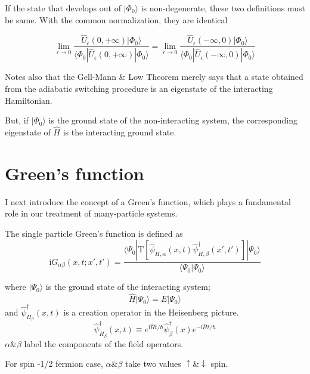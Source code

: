 
If the state that develops out of $|\Phi_0\rangle$ is non-degenerate, these two definitions must be same. With the common normalization, they are identical

\[\lim_{\epsilon\to0}\frac{\hat{U}_\epsilon(0,+\infty)|\Phi_0\rangle}{\langle\Phi_0|\hat{U}_\epsilon(0,+\infty)|\Phi_0\rangle}=\lim_{\epsilon\to0}\frac{\hat{U}_\epsilon(-\infty,0)|\Phi_0\rangle}{\langle\Phi_0|\hat{U}_\epsilon(-\infty,0)|\Phi_0\rangle} \]

Notes also that the Gell-Mann \& Low Theorem merely says that a state obtained from the adiabatic switching procedure is an eigenstate of the interacting Hamiltonian. 

But, if $|\Phi_0\rangle$ is the ground state of the non-interacting system, the corresponding eigenstate of $\hat{H}$ is {} the interacting ground state. 




\section{Green's function}

I next introduce the concept of a Green's function, which plays a fundamental role in our treatment of many-particle systems.

The single particle Green's function is defined as
\begin{equation}\label{2.3.1}
\mathrm{i}G_{\alpha\beta}(x,t;x',t')=\frac{\langle\Psi_0|\mathrm{T}[\hat \psi_{H,\alpha}(x,t)\hat \psi^{\dagger}_{H,\beta} (x',t')]|\Psi_0\rangle}{\langle\Psi_0|\Psi_0\rangle}
\end{equation}

where $|\Psi_0\rangle$ is the ground state of the interacting system;
\begin{equation}
\hat{H}|\Psi_0\rangle=E|\Psi_0\rangle \nonumber
\end{equation}
and $\hat \psi^{
\dagger}_{H_{\beta}}(x,t)$ is a creation operator in the Heisenberg picture.
\begin{equation}
\hat \psi^{
\dagger}_{H_{\beta}}(x,t) \equiv e^{\mathrm{i}\hat{H}t/\hbar}\hat \psi^{
\dagger}_{\beta}(x)e^{-\mathrm{i}\hat{H}t/\hbar} \nonumber
\end{equation}
$\alpha \& \beta$ label the components of the field operators.

For spin -1/2 fermion case, $\alpha \& \beta$ take two values $\uparrow \& \downarrow$ spin.

